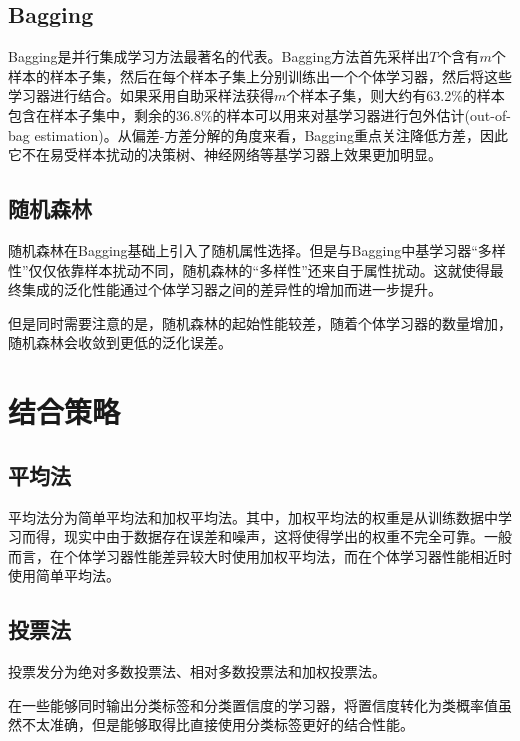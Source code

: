 \subsection{Bagging}

Bagging是并行集成学习方法最著名的代表。Bagging方法首先采样出$T$个含有$m$个样本的样本子集，然后在每个样本子集上分别训练出一个个体学习器，然后将这些学习器进行结合。如果采用自助采样法获得$m$个样本子集，则大约有63.2\%的样本包含在样本子集中，剩余的36.8\%的样本可以用来对基学习器进行包外估计(out-of-bag estimation)。从偏差-方差分解的角度来看，Bagging重点关注降低方差，因此它不在易受样本扰动的决策树、神经网络等基学习器上效果更加明显。

\subsection{随机森林}

随机森林在Bagging基础上引入了随机属性选择。但是与Bagging中基学习器``多样性''仅仅依靠样本扰动不同，随机森林的``多样性''还来自于属性扰动。这就使得最终集成的泛化性能通过个体学习器之间的差异性的增加而进一步提升。

但是同时需要注意的是，随机森林的起始性能较差，随着个体学习器的数量增加，随机森林会收敛到更低的泛化误差。

\section{结合策略}

\subsection{平均法}

平均法分为简单平均法和加权平均法。其中，加权平均法的权重是从训练数据中学习而得，现实中由于数据存在误差和噪声，这将使得学出的权重不完全可靠。一般而言，在个体学习器性能差异较大时使用加权平均法，而在个体学习器性能相近时使用简单平均法。

\subsection{投票法}

投票发分为绝对多数投票法、相对多数投票法和加权投票法。

在一些能够同时输出分类标签和分类置信度的学习器，将置信度转化为类概率值虽然不太准确，但是能够取得比直接使用分类标签更好的结合性能。

